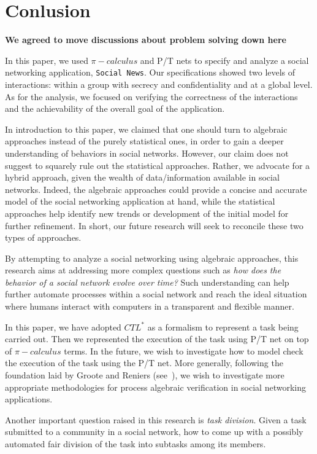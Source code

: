 \section{Conlusion} %
\label{sec:conlusion}

\textbf{We agreed to move discussions about problem solving down here}

In this paper, we used $\pi-calculus$ and P/T nets to specify and analyze a social networking application, {\tt Social News}. Our specifications showed two levels of interactions: within a group with
secrecy and confidentiality and at a global level. As for the analysis, we focused on verifying the correctness of the interactions and the achievability of the overall goal of the application.

In introduction to this paper, we claimed that one should turn to algebraic approaches instead of the purely statistical ones, in order to gain a deeper understanding of behaviors in social networks.
However, our claim does not suggest to squarely rule out the statistical approaches. Rather, we advocate for a hybrid approach, given the wealth of data/information available in social networks.
Indeed, the algebraic approaches could provide a concise and accurate model of the social networking application at hand, while the statistical approaches help identify new trends or development of the
initial model for further refinement. In short, our future research will seek to reconcile these two types of approaches.

By attempting to analyze a social networking using algebraic approaches, this research aims at addressing more complex questions such as \emph{how does the behavior of a social network evolve over
time?} Such understanding can help further automate processes within a social network and reach the ideal situation where humans interact with computers in a transparent and flexible manner.

In this paper, we have adopted $CTL^*$ as a formalism to represent a task being carried out. Then we represented the execution of the task using P/T net on top of $\pi-calculus$ terms. In the future,
we wish to investigate how to model check the execution of the task using the P/T net. More generally, following the foundation laid by Groote and Reniers (see~\cite{Groote-Reniers:01}), we wish to
investigate more appropriate methodologies for process algebraic verification in social networking applications.

Another important question raised in this research is \emph{task division}. Given a task submitted to a community in a social network, how to come up with a possibly automated fair division of the task
into subtasks among its members.


